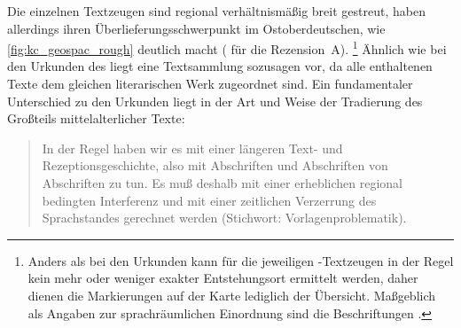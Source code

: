 Die einzelnen Textzeugen sind regional verhältnismäßig breit gestreut, haben
allerdings ihren Überlieferungsschwerpunkt im Ostoberdeutschen, wie
\cref{fig:kc_geospac_rough} deutlich macht
(\cite[vgl.~auch][]{klein1988} für die Rezension~A).%
%
	\footnote{Anders als bei den Urkunden kann für die jeweiligen
		\citet{kc}-Textzeugen in der Regel kein mehr oder weniger exakter
		Entstehungsort ermittelt werden, daher dienen die Markierungen auf der
		Karte lediglich der Übersicht. Maßgeblich als Angaben zur
		sprachräumlichen Einordnung sind die Beschriftungen
		\autocite[vgl.][]{wolf:kckat}.}
%
Ähnlich wie bei den Urkunden des \CAO{} liegt eine Textsammlung
sozusagen  vor, da alle enthaltenen Texte dem gleichen
literarischen Werk zugeordnet sind. Ein fundamentaler Unterschied zu den
Urkunden liegt in der Art und Weise der Tradierung des Großteils
mittelalterlicher Texte: \blockquote[{\cites[1310]{wegera2000}[siehe
auch][262--263]{fleischer2019}}]{In der Regel haben wir es mit einer längeren
Text- und Rezeptionsgeschichte, also mit Abschriften und Abschriften von
Abschriften zu tun. Es muß deshalb mit einer erheblichen regional bedingten
Interferenz und mit einer zeitlichen Verzerrung des Sprachstandes gerechnet
werden (Stichwort: Vorlagenproblematik).}


